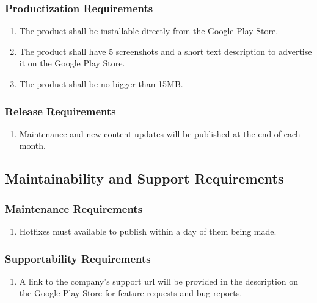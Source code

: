 \documentclass[]{article}
\begin{document}
\subsubsection{Productization Requirements}
\label{ssub:productization_requirements}
\begin{enumerate}[{OE}1. ]
	\resumeEnum
	\item The product shall be installable directly from the Google Play Store.
	\item The product shall have 5 screenshots and a short text description to advertise it on the Google Play Store.
	\item The product shall be no bigger than 15MB. 
	\holdEnum
\end{enumerate}

\subsubsection{Release Requirements}
\label{ssub:release_requirements}
\begin{enumerate}[{OE}1. ]
	\resumeEnum
	\item Maintenance and new content updates will be published at the end of each month.
	\holdEnum
\end{enumerate}


\subsection{Maintainability and Support Requirements}
\label{sub:maintainability_and_support_requirements}

\subsubsection{Maintenance Requirements}
\label{ssub:maintenance_requirements}
\begin{enumerate}[{MS}1. ]
	\item Hotfixes must available to publish within a day of them being made.
	\holdEnum
\end{enumerate}

\subsubsection{Supportability Requirements}
\label{ssub:supportability_requirements}
\begin{enumerate}[{MS}1. ]
	\resumeEnum
	\item A link to the company's support url will be provided in the description on the Google Play Store for feature requests and bug reports.
	\holdEnum
\end{enumerate}
\end{document}
